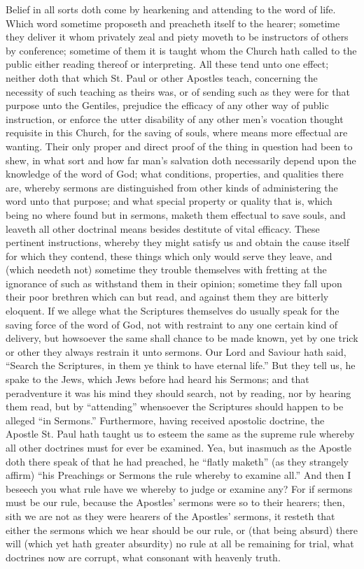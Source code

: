 Belief in all sorts doth come by hearkening and attending  to the word of life. Which word sometime proposeth and preacheth itself to the hearer; sometime they deliver it whom privately zeal and piety moveth to be instructors of others by conference; sometime of them it is taught whom the Church hath called to the public either reading thereof or interpreting. All these tend unto one effect; neither doth that which St. Paul or other Apostles teach, concerning the necessity of such teaching as theirs was, or of sending such as they were for that purpose unto the Gentiles, prejudice the efficacy of any other way of public instruction, or enforce the utter disability of any other men’s vocation thought requisite in this Church, for the saving of souls, where means more effectual are wanting.
Their only proper and direct proof of the thing in question had been to shew, in what sort and how far man’s salvation doth necessarily depend upon the knowledge of the word of God; what conditions, properties, and qualities there are, whereby sermons are distinguished from other kinds of administering the word unto that purpose; and what special property or quality that is, which being no where found but in sermons, maketh them effectual to save souls, and leaveth all other doctrinal means besides destitute of vital efficacy. These pertinent instructions, whereby they might satisfy us and obtain the cause itself for which they contend, these things which only would serve they leave, and (which needeth not) sometime they trouble themselves with fretting at the ignorance of such as withstand them in their opinion; sometime they fall upon their poor brethren which can but read, and against them they are bitterly eloquent.
If we allege what the Scriptures themselves do usually speak for the saving force of the word of God, not with restraint to any one certain kind of delivery, but howsoever the same shall chance to be made known, yet by one trick  or other they always restrain it unto sermons. Our Lord and Saviour hath said, “Search the Scriptures, in them ye think to have eternal life.” But they tell us, he spake to the Jews, which Jews before had heard his Sermons; and that peradventure it was his mind they should search, not by reading, nor by hearing them read, but by “attending” whensoever the Scriptures should happen to be alleged “in Sermons.”
Furthermore, having received apostolic doctrine, the Apostle St. Paul hath taught us to esteem the same as the supreme rule whereby all other doctrines must for ever be examined. Yea, but inasmuch as the Apostle doth there speak of that he had preached, he “flatly maketh” (as they strangely affirm) “his Preachings or Sermons the rule whereby to examine all.” And then I beseech you what rule have we whereby to judge or examine any? For if sermons must be our rule, because the Apostles’ sermons were so to their hearers; then, sith we are not as they were hearers of the Apostles’ sermons, it resteth that either the sermons which we hear should be our rule, or (that being absurd) there will (which yet hath greater absurdity) no rule at all be remaining for trial, what doctrines now are corrupt, what consonant with heavenly truth.
